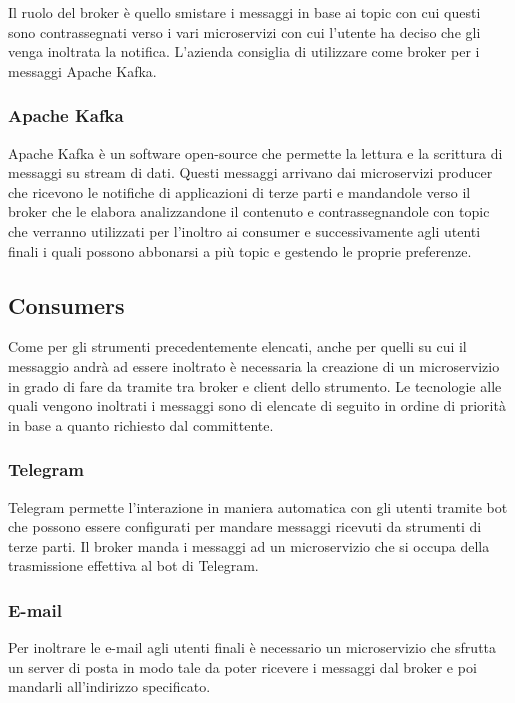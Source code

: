 		Il ruolo del broker è quello smistare i messaggi in base ai topic con cui questi sono contrassegnati verso i vari microservizi con cui l'utente ha deciso che gli venga inoltrata la notifica.
		L'azienda consiglia di utilizzare come broker per i messaggi Apache Kafka.
	
		\subsubsection{Apache Kafka}
		Apache Kafka è un software open-source che permette la lettura e la scrittura di messaggi su stream di dati.
		Questi messaggi arrivano dai microservizi producer che ricevono le notifiche di applicazioni di terze parti e mandandole verso il broker che le elabora analizzandone il contenuto e contrassegnandole con topic che verranno utilizzati per l'inoltro ai consumer e successivamente agli utenti finali i quali possono abbonarsi a più topic e gestendo le proprie preferenze.
		
	
	\subsection{Consumers}
		Come per gli strumenti precedentemente elencati, anche per quelli su cui il messaggio andrà ad essere inoltrato è necessaria la creazione di un microservizio in grado di fare da tramite tra broker e client dello strumento.
		Le tecnologie alle quali vengono inoltrati i messaggi sono di elencate di seguito in ordine di priorità in base a quanto richiesto dal committente.
			
		\subsubsection{Telegram}
		Telegram permette l'interazione in maniera automatica con gli utenti tramite bot che possono essere configurati per mandare messaggi ricevuti da strumenti di terze parti.
		Il broker manda i messaggi ad un microservizio che si occupa della trasmissione effettiva al bot di Telegram.
		
		\subsubsection{E-mail}
		Per inoltrare le e-mail agli utenti finali è necessario un microservizio che sfrutta un server di posta in modo tale da poter ricevere i messaggi dal broker e poi mandarli all'indirizzo specificato.
		
